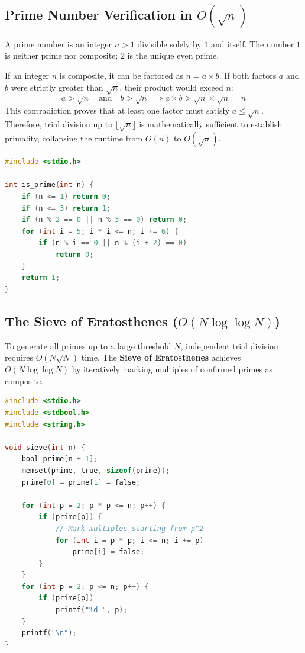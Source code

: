 \subsection{Prime Number Verification in $O(\sqrt{n})$}
A prime number is an integer $n > 1$ divisible solely by $1$ and itself. The number $1$ is neither prime nor composite; $2$ is the unique even prime.

\begin{keyconcept}
If an integer $n$ is composite, it can be factored as $n = a \times b$. If both factors $a$ and $b$ were strictly greater than $\sqrt{n}$, their product would exceed $n$:
\[
a > \sqrt{n} \quad \text{and} \quad b > \sqrt{n} \implies a \times b > \sqrt{n} \times \sqrt{n} = n
\]
This contradiction proves that at least one factor must satisfy $a \le \sqrt{n}$. Therefore, trial division up to $\lfloor\sqrt{n}\rfloor$ is mathematically sufficient to establish primality, collapsing the runtime from $O(n)$ to $O(\sqrt{n})$.
\end{keyconcept}

\begin{lstlisting}[language=C]
#include <stdio.h>

int is_prime(int n) {
    if (n <= 1) return 0;
    if (n <= 3) return 1;
    if (n % 2 == 0 || n % 3 == 0) return 0;
    for (int i = 5; i * i <= n; i += 6) {
        if (n % i == 0 || n % (i + 2) == 0)
            return 0;
    }
    return 1;
}
\end{lstlisting}

\subsection{The Sieve of Eratosthenes ($O(N \log \log N)$)}
To generate all primes up to a large threshold $N$, independent trial division requires $O(N \sqrt{N})$ time. The \textbf{Sieve of Eratosthenes} achieves $O(N \log \log N)$ by iteratively marking multiples of confirmed primes as composite.

\begin{lstlisting}[language=C]
#include <stdio.h>
#include <stdbool.h>
#include <string.h>

void sieve(int n) {
    bool prime[n + 1];
    memset(prime, true, sizeof(prime));
    prime[0] = prime[1] = false;

    for (int p = 2; p * p <= n; p++) {
        if (prime[p]) {
            // Mark multiples starting from p^2
            for (int i = p * p; i <= n; i += p)
                prime[i] = false;
        }
    }
    for (int p = 2; p <= n; p++) {
        if (prime[p])
            printf("%d ", p);
    }
    printf("\n");
}
\end{lstlisting}

